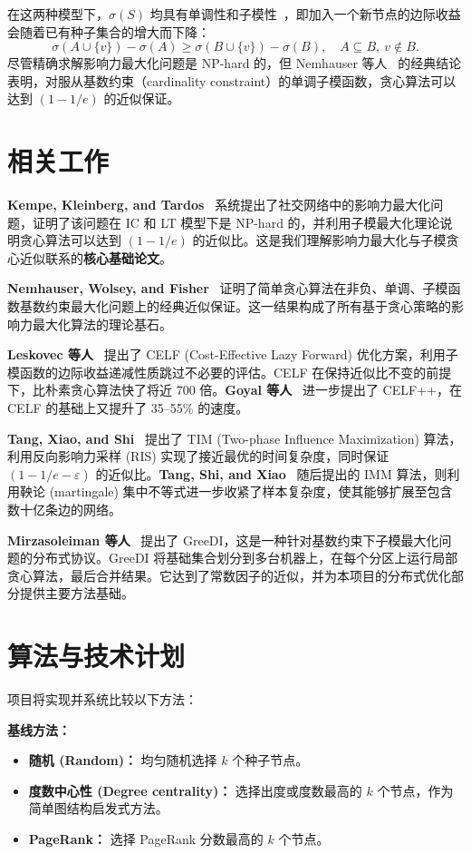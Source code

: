 \documentclass[UTF8, 10pt]{ctexart}
\begin{document}
在这两种模型下，$\sigma(S)$ 均具有单调性和子模性~\cite{kempe2003}，即加入一个新节点的边际收益会随着已有种子集合的增大而下降：
\[
    \sigma(A\cup\{v\})-\sigma(A)
    \geq
    \sigma(B\cup\{v\})-\sigma(B),
    \quad A\subseteq B,\ v\notin B.
\]
尽管精确求解影响力最大化问题是 NP-hard 的，但 Nemhauser 等人~\cite{nemhauser1978} 的经典结论表明，对服从基数约束（cardinality constraint）的单调子模函数，贪心算法可以达到 $(1-1/e)$ 的近似保证。

\section{相关工作}

\textbf{Kempe, Kleinberg, and Tardos}~\cite{kempe2003} 系统提出了社交网络中的影响力最大化问题，证明了该问题在 IC 和 LT 模型下是 NP-hard 的，并利用子模最大化理论说明贪心算法可以达到 $(1-1/e)$ 的近似比。这是我们理解影响力最大化与子模贪心近似联系的\textbf{核心基础论文}。

\textbf{Nemhauser, Wolsey, and Fisher}~\cite{nemhauser1978} 证明了简单贪心算法在非负、单调、子模函数基数约束最大化问题上的经典近似保证。这一结果构成了所有基于贪心策略的影响力最大化算法的理论基石。

\textbf{Leskovec 等人}~\cite{leskovec2007} 提出了 CELF (Cost-Effective Lazy Forward) 优化方案，利用子模函数的边际收益递减性质跳过不必要的评估。CELF 在保持近似比不变的前提下，比朴素贪心算法快了将近 700 倍。\textbf{Goyal 等人}~\cite{goyal2011} 进一步提出了 CELF++，在 CELF 的基础上又提升了 35--55\% 的速度。

\textbf{Tang, Xiao, and Shi}~\cite{tang2014} 提出了 TIM (Two-phase Influence Maximization) 算法，利用反向影响力采样 (RIS) 实现了接近最优的时间复杂度，同时保证 $(1-1/e-\varepsilon)$ 的近似比。\textbf{Tang, Shi, and Xiao}~\cite{tang2015} 随后提出的 IMM 算法，则利用鞅论 (martingale) 集中不等式进一步收紧了样本复杂度，使其能够扩展至包含数十亿条边的网络。

\textbf{Mirzasoleiman 等人}~\cite{mirzasoleiman2013} 提出了 GreeDI，这是一种针对基数约束下子模最大化问题的分布式协议。GreeDI 将基础集合划分到多台机器上，在每个分区上运行局部贪心算法，最后合并结果。它达到了常数因子的近似，并为本项目的分布式优化部分提供主要方法基础。

\section{算法与技术计划}

项目将实现并系统比较以下方法：

\textbf{基线方法：}
\begin{itemize}
    \item \textbf{随机 (Random)：} 均匀随机选择 $k$ 个种子节点。
    \item \textbf{度数中心性 (Degree centrality)：} 选择出度或度数最高的 $k$ 个节点，作为简单图结构启发式方法。
    \item \textbf{PageRank：} 选择 PageRank 分数最高的 $k$ 个节点。
\end{itemize}
\end{document}
